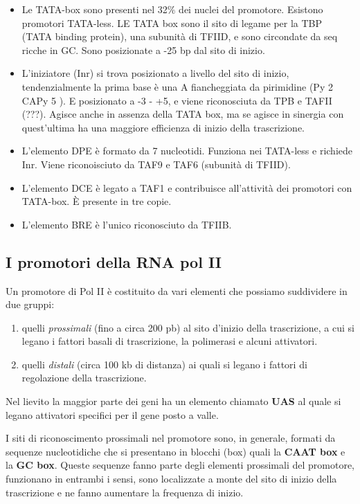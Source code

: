\documentclass[11pt]{book}
\begin{document}
\begin{itemize}
\item
  Le TATA-box sono presenti nel 32\% dei nuclei del promotore. Esistono
  promotori TATA-less. LE TATA box sono il sito di legame per la TBP
  (TATA binding protein), una subunità di TFIID, e sono circondate da
  seq ricche in GC. Sono posizionate a -25 bp dal sito di inizio.
\item
  L'iniziatore (Inr) si trova posizionato a livello del sito di inizio,
  tendenzialmente la prima base è una A fiancheggiata da pirimidine (Py
  2 CAPy 5 ). E posizionato a -3 - +5, e viene riconosciuta da TPB e
  TAFII (???). Agisce anche in assenza della TATA box, ma se agisce in
  sinergia con quest'ultima ha una maggiore efficienza di inizio della
  trascrizione.
\item
  L'elemento DPE è formato da 7 nucleotidi. Funziona nei TATA-less e
  richiede Inr. Viene riconoisciuto da TAF9 e TAF6 (subunità di TFIID).
\item
  L'elemento DCE è legato a TAF1 e contribuisce all'attività dei
  promotori con TATA-box. È presente in tre copie.
\item
  L'elemento BRE è l'unico riconosciuto da TFIIB.
\end{itemize}

\subsection{I promotori della RNA pol
II}\label{i-promotori-della-rna-pol-ii}

Un promotore di Pol II è costituito da vari elementi che possiamo
suddividere in due gruppi:

\begin{enumerate}
\def\labelenumi{\arabic{enumi}.}
\itemsep1pt\parskip0pt
\item
  quelli \emph{prossimali} (fino a circa 200 pb) al sito d'inizio della
  trascrizione, a cui si legano i fattori basali di trascrizione, la
  polimerasi e alcuni attivatori.
\item
  quelli \emph{distali} (circa 100 kb di distanza) ai quali si legano i
  fattori di regolazione della trascrizione.
\end{enumerate}

Nel lievito la maggior parte dei geni ha un elemento chiamato
\textbf{UAS} al quale si legano attivatori specifici per il gene posto a
valle.

I siti di riconoscimento prossimali nel promotore sono, in generale,
formati da sequenze nucleotidiche che si presentano in blocchi (box)
quali la \textbf{CAAT box} e la \textbf{GC box}. Queste sequenze fanno
parte degli elementi prossimali del promotore, funzionano in entrambi i
sensi, sono localizzate a monte del sito di inizio della trascrizione e
ne fanno aumentare la frequenza di inizio.
\end{document}
